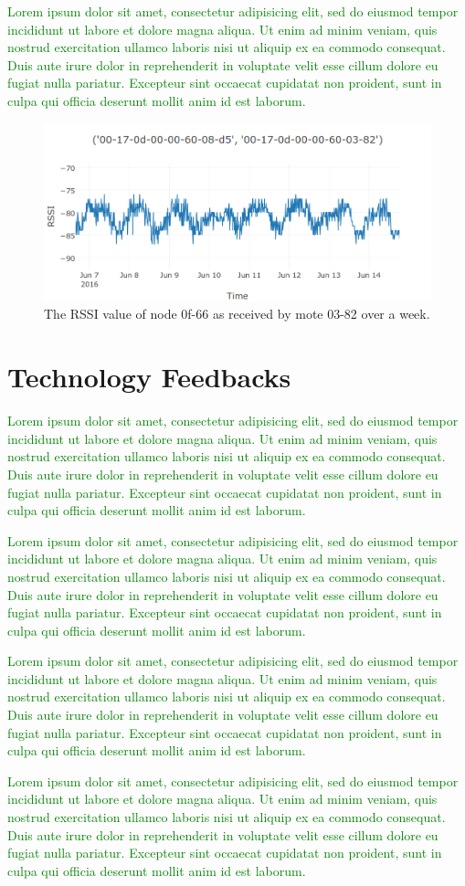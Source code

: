 \documentclass{sig-alternate}
\newcommand{\lorem}               {\textcolor{green}{Lorem ipsum dolor sit amet, consectetur adipisicing elit, sed do eiusmod tempor incididunt ut labore et dolore magna aliqua. Ut enim ad minim veniam, quis nostrud exercitation ullamco laboris nisi ut aliquip ex ea commodo consequat. Duis aute irure dolor in reprehenderit in voluptate velit esse cillum dolore eu fugiat nulla pariatur. Excepteur sint occaecat cupidatat non proident, sunt in culpa qui officia deserunt mollit anim id est laborum.}}
\begin{document}

\lorem

\begin{figure}
    \centering
    \includegraphics[width=\columnwidth]{periodic_rssi}
    \caption{The RSSI value of node 0f-66 as received by mote 03-82 over a week.}
    \label{fig:reliability}
\end{figure}

\section{Technology Feedbacks}
\label{sec:technology}


\lorem


\lorem


\lorem


\lorem






\end{document}
